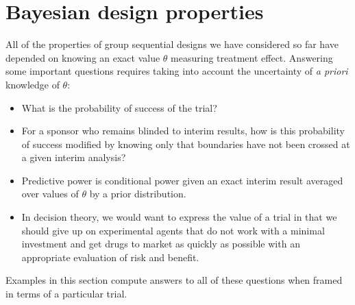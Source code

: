 \section{Bayesian design properties\label{sec:Bayes}}
All of the properties of group sequential designs we have considered so far have depended on knowing an exact value $\theta$ measuring treatment effect.
Answering some important questions requires taking into account the uncertainty of {\it a priori} knowledge of $\theta$:
\begin{itemize}
\item What is the probability of success of the trial?
\item For a sponsor who remains blinded to interim results, how is this probability of success modified by knowing only that boundaries have not been crossed at a given interim analysis?
\item Predictive power is conditional power given an exact interim result averaged over values of $\theta$ by a prior distribution. 
\item In decision theory, we would want to express the value of a trial in that we should give up on experimental agents that do not work with a minimal investment and get drugs to market as quickly as possible with an appropriate  evaluation of risk and benefit.
\end{itemize}
Examples in this section compute answers to all of these questions when framed in terms of a particular trial.
